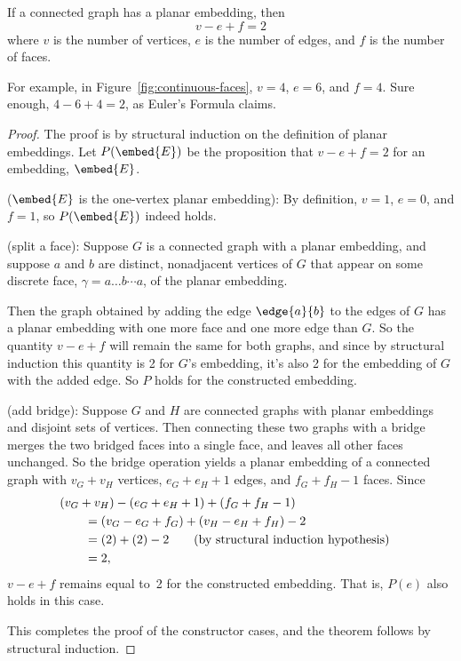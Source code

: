 \begin{theorem}\label{thm:eulers_formula}
If a connected graph has a planar embedding, then
\begin{equation*}
    v - e + f = 2
\end{equation*}
where $v$ is the number of vertices, $e$ is the number of edges, and
$f$ is the number of faces.
\end{theorem}

For example, in Figure~\ref{fig:continuous-faces}, $v = 4$,
$e = 6$, and $f = 4$.  Sure enough, $4 - 6 + 4 = 2$, as Euler's
Formula claims.

\begin{proof}
The proof is by structural induction on the definition of planar
embeddings.  Let $P(\embed{E})$ be the proposition that $v - e + f = 2$ for an
embedding, $\embed{E}$.

 ($\embed{E}$ is the one-vertex planar
embedding):  By definition, $v=1$, $e=0$, and $f=1$, so $P(\embed{E})$
indeed holds.

 (split a face): Suppose $G$ is a
connected graph with a planar embedding, and suppose $a$ and $b$ are
distinct, nonadjacent vertices of $G$ that appear on some discrete
face, $\gamma= a \dots b \cdots a$, of the planar embedding.

Then the graph obtained by adding the edge $\edge{a}{b}$ to the edges of
$G$ has a planar embedding with one more face and one more edge than $G$.
So the quantity $v-e+f$ will remain the same for both graphs, and since by
structural induction this quantity is 2 for $G$'s embedding, it's also 2
for the embedding of $G$ with the added edge.  So $P$ holds for the
constructed embedding.

 (add bridge): Suppose $G$ and $H$ are
connected graphs with planar embeddings and disjoint sets of vertices.
Then connecting these two graphs with a bridge merges the two bridged
faces into a single face, and leaves all other faces unchanged.  So
the bridge operation yields a planar embedding of a connected graph
with $v_G +v_H$ vertices, $e_G + e_H +1$ edges, and $f_G + f_H - 1$
faces.  Since
\begin{align*}
\lefteqn{(v_G +v_H) - (e_G + e_H +1) + (f_G + f_H - 1)} \qquad\\
   & = (v_G  - e_G + f_G) + (v_H  - e_H  + f_H) -2\\
   & = (2)+(2)-2 \qquad \text{(by structural induction hypothesis)}\\
   & = 2,
\end{align*}
$v-e+f$ remains equal to~2 for the constructed embedding.  That is,
$P(e)$ also holds in this case.

This completes the proof of the constructor cases, and the theorem follows
by structural induction.
\end{proof}


